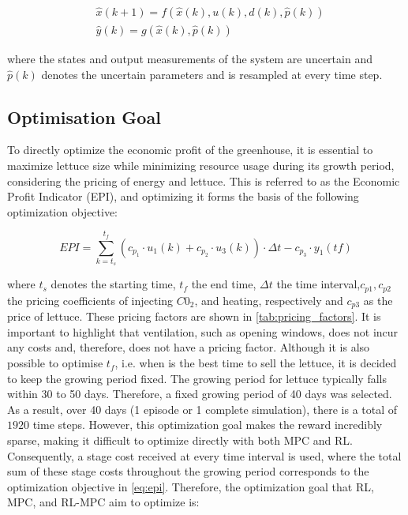 \begin{equation}\label{eq:greenhouse_model_discrete_uncertain}
	\begin{aligned}
		& \hat x(k+1) = f(\hat x(k),u(k),d(k),\hat p(k)) \\
		& \hat y(k) = g(\hat x(k),\hat p(k))
	\end{aligned}
\end{equation}

where the states and output measurements of the system are uncertain and $\hat{p}(k)$ denotes the uncertain parameters and is resampled at every time step.



\subsection{Optimisation Goal}
\label{ssection:optimization-goal}
To directly optimize the economic profit of the greenhouse, it is essential to maximize lettuce size while minimizing resource usage during its growth period, considering the pricing of energy and lettuce. This is referred to as the Economic Profit Indicator (EPI), and optimizing it forms the basis of the following optimization objective:

\begin{equation}\label{eq:epi}
	EPI = \sum_{k = t_s}^{t_f} (c_{p_1} \cdot u_1(k) + c_{p_2} \cdot u_3(k))\cdot \Delta t - c_{p_3} \cdot y_1(tf)
\end{equation}

where $t_s$ denotes the starting time, $t_f$ the end time, $\Delta t$ the time interval,$c_{p1},c_{p2}$ the pricing coefficients of injecting $C0_2$, and heating, respectively and $c_{p3}$ as the price of lettuce. These pricing factors are shown in \autoref{tab:pricing_factors}. It is important to highlight that ventilation, such as opening windows, does not incur any costs and, therefore, does not have a pricing factor. Although it is also possible to optimise $t_f$, i.e. when is the best time to sell the lettuce, it is decided to keep the growing period fixed. The growing period for lettuce typically falls within 30 to 50 days. Therefore, a fixed growing period of 40 days was selected. As a result, over 40 days (1 episode or 1 complete simulation), there is a total of $1920$ time steps. 
However, this optimization goal makes the reward incredibly sparse, making it difficult to optimize directly with both MPC and RL. Consequently, a stage cost received at every time interval is used, where the total sum of these stage costs throughout the growing period corresponds to the optimization objective in \autoref{eq:epi}. Therefore, the optimization goal that RL, MPC, and RL-MPC aim to optimize is:

